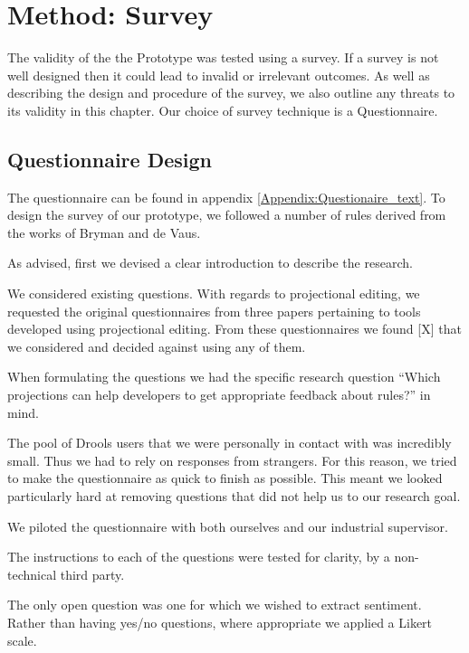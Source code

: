 \section{Method: Survey}\label{section:Method_survey}
The validity of the the Prototype was tested using a survey.
If a survey is not well designed then it could lead to invalid or irrelevant outcomes.
As well as describing the design and procedure of the survey, we also outline any threats to its validity in this chapter.
Our choice of survey technique is a Questionnaire.

\subsection{Questionnaire Design}
The questionnaire can be found in appendix \ref{Appendix:Questionaire_text}.
To design the survey of our prototype, we followed a number of rules derived from the works of Bryman\cite{bryman2016social} and de Vaus\cite{de2013surveys}.

As advised, first we devised a clear introduction to describe the research.

We considered existing questions.
With regards to projectional editing, we requested the original questionnaires from three papers\cite{meacham2020adaptivevle,berger2016efficiency, voelter2014towards} pertaining to tools developed using projectional editing.
From these questionnaires we found [X] that we considered and decided against using any of them.

When formulating the questions we had the specific research question ``Which projections can help developers to get appropriate feedback about rules?'' in mind.

The pool of Drools users that we were personally in contact with was incredibly small.
Thus we had to rely on responses from strangers.
For this reason, we tried to make the questionnaire as quick to finish as possible.
This meant we looked particularly hard at removing questions that did not help us to our research goal.

We piloted the questionnaire with both ourselves and our industrial supervisor.

The instructions to each of the questions were tested for clarity, by a non-technical third party.

The only open question was one for which we wished to extract sentiment.
Rather than having yes/no questions, where appropriate we applied a Likert scale\cite{likert1932technique}.

